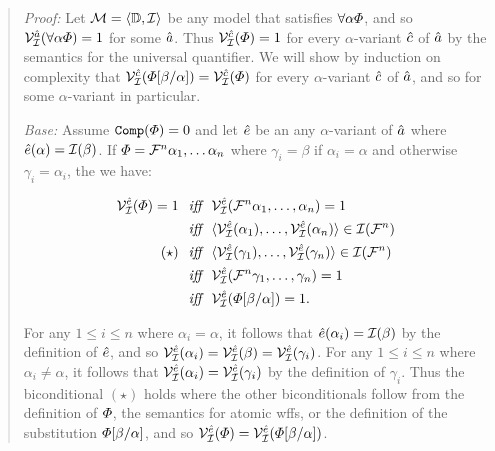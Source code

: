 \begin{quote} 
  \textit{Proof:} Let $\mathcal{M}=\langle\mathbb{D},\mathcal{I}\rangle$ be any model that satisfies $\forall \alpha\varPhi$, and so $\mathcal{V}_{\mathcal{I}}^{\hat{a}}(\forall \alpha\varPhi)=1$ for some $\hat{a}$.
  Thus $\mathcal{V}_{\mathcal{I}}^{\hat{c}}(\varPhi)=1$ for every $\alpha$-variant $\hat{c}$ of $\hat{a}$ by the semantics for the universal quantifier.
  We will show by induction on complexity that $\mathcal{V}_{\mathcal{I}}^{\hat{c}}(\varPhi[\beta/\alpha])=\mathcal{V}_{\mathcal{I}}^{\hat{c}}(\varPhi)$ for every $\alpha$-variant $\hat{c}$ of $\hat{a}$, and so for some $\alpha$-variant in particular.

  \textit{Base:} Assume $\texttt{Comp}(\varPhi)=0$ and let $\hat{e}$ be an any $\alpha$-variant of $\hat{a}$ where $\hat{e}(\alpha)=\mathcal{I}(\beta)$.
  If $\varPhi=\mathcal{F}^n\alpha_1,\ldots\alpha_n$ where $\gamma_i=\beta$ if $\alpha_i=\alpha$ and otherwise $\gamma_i=\alpha_i$, the we have:

  \vspace{-.2in}
  \begin{align*}
    \mathcal{V}_{\mathcal{I}}^{\hat{e}}(\varPhi)=1 &\textit{ ~iff~ } \mathcal{V}_{\mathcal{I}}^{\hat{e}}(\mathcal{F}^n\alpha_1,\ldots,\alpha_n)=1\\
      &\textit{ ~iff~ } \langle\mathcal{V}_{\mathcal{I}}^{\hat{e}}(\alpha_1),\ldots,\mathcal{V}_{\mathcal{I}}^{\hat{e}}(\alpha_n)\rangle\in\mathcal{I}(\mathcal{F}^n)\\
      (\star) &\textit{ ~iff~ } \langle\mathcal{V}_{\mathcal{I}}^{\hat{e}}(\gamma_1),\ldots,\mathcal{V}_{\mathcal{I}}^{\hat{e}}(\gamma_n)\rangle\in\mathcal{I}(\mathcal{F}^n)\\
      &\textit{ ~iff~ } \mathcal{V}_{\mathcal{I}}^{\hat{e}}(\mathcal{F}^n\gamma_1,\ldots,\gamma_n)=1\\
      &\textit{ ~iff~ } \mathcal{V}_{\mathcal{I}}^{\hat{e}}(\varPhi[\beta/\alpha])=1.
  \end{align*}

  For any $1\leq i\leq n$ where $\alpha_i=\alpha$, it follows that $\hat{e}(\alpha_i)=\mathcal{I}(\beta)$ by the definition of $\hat{e}$, and so $\mathcal{V}_{\mathcal{I}}^{\hat{e}}(\alpha_i)=\mathcal{V}_{\mathcal{I}}^{\hat{e}}(\beta)=\mathcal{V}_{\mathcal{I}}^{\hat{e}}(\gamma_i)$. 
  For any $1\leq i\leq n$ where $\alpha_i\neq\alpha$, it follows that $\mathcal{V}_{\mathcal{I}}^{\hat{e}}(\alpha_i)=\mathcal{V}_{\mathcal{I}}^{\hat{e}}(\gamma_i)$ by the definition of $\gamma_i$. 
  Thus the biconditional $(\star)$ holds where the other biconditionals follow from the definition of $\varPhi$, the semantics for atomic wffs, or the definition of the substitution $\varPhi[\beta/\alpha]$, and so $\mathcal{V}_{\mathcal{I}}^{\hat{e}}(\varPhi)=\mathcal{V}_{\mathcal{I}}^{\hat{e}}(\varPhi[\beta/\alpha])$.
  

\end{quote}
